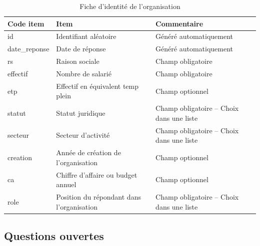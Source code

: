 \begin{table}[h]
    \caption{Fiche d'identité de l'organisation}
    \label{tab:identiteorga}
    \centering
    \begin{tabularx}{\linewidth}{|l|L|L|}
        \hline
        \textbf{Code item} & \textbf{Item} &	\textbf{Commentaire} \\ \hline
         
        id&	Identifiant aléatoire 	&Généré automatiquement\\ \hline
        date\_reponse&	Date de réponse	&Généré automatiquement\\ \hline
        rs&	Raison sociale	&Champ obligatoire\\ \hline
        effectif&	Nombre de salarié	&Champ obligatoire\\ \hline
        etp	&Effectif en équivalent temp plein&	Champ optionnel\\ \hline
        statut&	Statut juridique	&Champ obligatoire – Choix dans une liste\\ \hline
        secteur	&Secteur d’activité	&Champ obligatoire – Choix dans une liste\\ \hline
        creation&	Année de création de l’organisation&	Champ optionnel\\ \hline
        ca	&Chiffre d’affaire ou budget annuel	&Champ optionnel\\ \hline
        role&	Position du répondant dans l’organisation&	Champ obligatoire – Choix dans une liste\\ \hline

    \end{tabularx}
    
\end{table}

\subsection{Questions ouvertes}


